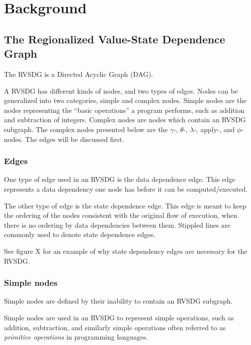 
\clearpage
\section{Background}
\label{background}

\subsection{The Regionalized Value-State Dependence Graph}
\label{background:RVSDG}

The RVSDG is a Directed Acyclic Graph (DAG).

A RVSDG has different kinds of nodes, and two types of edges. Nodes can be
generalized into two categories, simple and complex nodes. Simple nodes are the
nodes representing the ``basic operations'' a program performs, such as addition
and subtraction of integers. Complex nodes are nodes which contain an RVSDG
subgraph. The complex nodes presented below are the $\gamma$-, $\theta$-,
$\lambda$-, apply-, and $\phi$-nodes. The edges will be discussed first.

\subsubsection{Edges}

One type of edge used in an RVSDG is the data dependence edge. This edge
represents a data dependency one node has before it can be computed/executed.

The other type of edge is the state dependence edge. This edge is meant to keep
the ordering of the nodes consistent with the original flow of execution, when
there is no ordering by data dependencies between them. Stippled lines are
commonly used to denote state dependence edges.

See figure X for an example of why state dependency edges are necessary for the
RVSDG.

\subsubsection{Simple nodes}

Simple nodes are defined by their inability to contain an RVSDG subgraph.

Simple nodes are used in an RVSDG to represent simple operations, such as
addition, subtraction, and similarly simple operations often referred to as
\textit{primitive operations} in programming languages.

